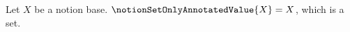 

\begin{definition}\label{notion_set_only_annotated_value}
    Let $X$ be a notion base.
    $\notionSetOnlyAnnotatedValue{X}=X$, which is a set.
\end{definition}
